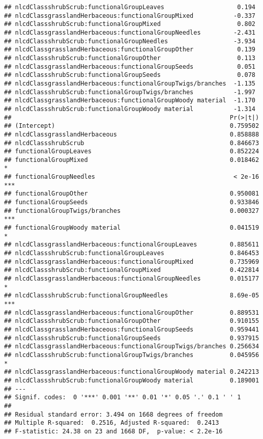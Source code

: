 \documentclass[]{article}
\begin{document}
\begin{verbatim}
## nlcdClassshrubScrub:functionalGroupLeaves                    0.194
## nlcdClassgrasslandHerbaceous:functionalGroupMixed           -0.337
## nlcdClassshrubScrub:functionalGroupMixed                     0.802
## nlcdClassgrasslandHerbaceous:functionalGroupNeedles         -2.431
## nlcdClassshrubScrub:functionalGroupNeedles                  -3.934
## nlcdClassgrasslandHerbaceous:functionalGroupOther            0.139
## nlcdClassshrubScrub:functionalGroupOther                     0.113
## nlcdClassgrasslandHerbaceous:functionalGroupSeeds            0.051
## nlcdClassshrubScrub:functionalGroupSeeds                     0.078
## nlcdClassgrasslandHerbaceous:functionalGroupTwigs/branches  -1.135
## nlcdClassshrubScrub:functionalGroupTwigs/branches           -1.997
## nlcdClassgrasslandHerbaceous:functionalGroupWoody material  -1.170
## nlcdClassshrubScrub:functionalGroupWoody material           -1.314
##                                                            Pr(>|t|)    
## (Intercept)                                                0.759502    
## nlcdClassgrasslandHerbaceous                               0.858888    
## nlcdClassshrubScrub                                        0.846673    
## functionalGroupLeaves                                      0.852224    
## functionalGroupMixed                                       0.018462 *  
## functionalGroupNeedles                                      < 2e-16 ***
## functionalGroupOther                                       0.950081    
## functionalGroupSeeds                                       0.933846    
## functionalGroupTwigs/branches                              0.000327 ***
## functionalGroupWoody material                              0.041519 *  
## nlcdClassgrasslandHerbaceous:functionalGroupLeaves         0.885611    
## nlcdClassshrubScrub:functionalGroupLeaves                  0.846453    
## nlcdClassgrasslandHerbaceous:functionalGroupMixed          0.735969    
## nlcdClassshrubScrub:functionalGroupMixed                   0.422814    
## nlcdClassgrasslandHerbaceous:functionalGroupNeedles        0.015177 *  
## nlcdClassshrubScrub:functionalGroupNeedles                 8.69e-05 ***
## nlcdClassgrasslandHerbaceous:functionalGroupOther          0.889531    
## nlcdClassshrubScrub:functionalGroupOther                   0.910155    
## nlcdClassgrasslandHerbaceous:functionalGroupSeeds          0.959441    
## nlcdClassshrubScrub:functionalGroupSeeds                   0.937915    
## nlcdClassgrasslandHerbaceous:functionalGroupTwigs/branches 0.256634    
## nlcdClassshrubScrub:functionalGroupTwigs/branches          0.045956 *  
## nlcdClassgrasslandHerbaceous:functionalGroupWoody material 0.242213    
## nlcdClassshrubScrub:functionalGroupWoody material          0.189001    
## ---
## Signif. codes:  0 '***' 0.001 '**' 0.01 '*' 0.05 '.' 0.1 ' ' 1
## 
## Residual standard error: 3.494 on 1668 degrees of freedom
## Multiple R-squared:  0.2516, Adjusted R-squared:  0.2413 
## F-statistic: 24.38 on 23 and 1668 DF,  p-value: < 2.2e-16
\end{verbatim}
\end{document}
